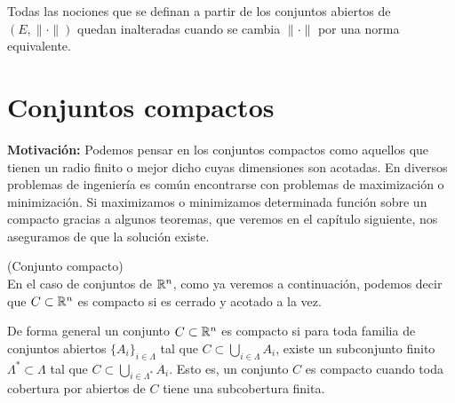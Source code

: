 \begin{nota} 
Todas las nociones que se definan a partir de los conjuntos abiertos de $(E,\|\cdot\|)$ quedan inalteradas cuando se cambia $\|\cdot\|$ por una norma equivalente.
\end{nota}


\section{Conjuntos compactos}

\textbf{Motivaci\'on:} Podemos pensar en los conjuntos compactos como aquellos que tienen un radio finito o mejor dicho cuyas dimensiones son acotadas. En diversos problemas de ingenier\'ia es com\'un encontrarse con problemas de maximizaci\'on o minimizaci\'on. Si  maximizamos o minimizamos determinada funci\'on sobre un compacto gracias a algunos teoremas, que veremos en el cap\'itulo siguiente, nos aseguramos de que la soluci\'on existe.

\begin{definicion}{\rm (Conjunto compacto)}\label{def-compacto}
\\En el caso de conjuntos de $\mathbb{R}^n$, como ya veremos a continuaci\'on, podemos decir que $C\subset \mathbb{R}^n$ es compacto si es cerrado y acotado a la vez. 

De forma general un conjunto $C\subset \mathbb{R}^n$ es compacto si para toda familia de conjuntos abiertos $\{A_i\}_{i \in \Lambda}$ tal que $C\subset \bigcup_{i \in \Lambda} A_i$, existe un subconjunto finito $\Lambda^* \subset \Lambda$ tal que  $C\subset \bigcup_{i \in \Lambda^*} A_i$. Esto es, un conjunto $C$ es compacto cuando toda cobertura por abiertos de $C$ tiene una subcobertura finita. 
\end{definicion}


